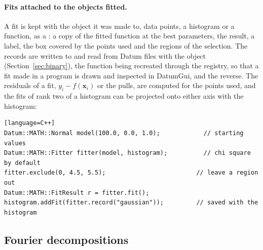 \paragraph{Fits attached to the objects fitted.}
A fit is kept with the object it was made to, data points, a histogram or a function, as a : a copy of
the fitted function at the best parameters, the result, a label, the box covered by the points used and the regions
of the selection. The records are written to and read from Datum files with the object (Section~\ref{sec:binary}),
the function being recreated through the registry, so that a fit made in a program is drawn and inspected in
DatumGui, and the reverse. The residuals of a fit, $y_i - f(\mathbf{x}_i)$ or the pulls, are computed for the points
used, and the fits of rank two of a histogram can be projected onto either axis with the histogram:
\begin{widetext}
\begin{verbatim}[language=C++]
Datum::MATH::Normal model(100.0, 0.0, 1.0);            // starting values
Datum::MATH::Fitter fitter(model, histogram);          // chi square by default
fitter.exclude(0, 4.5, 5.5);                         // leave a region out
Datum::MATH::FitResult r = fitter.fit();
histogram.addFit(fitter.record("gaussian"));         // saved with the histogram
\end{verbatim}
\end{widetext}

\subsection{Fourier decompositions}
\label{sec:fourier}

